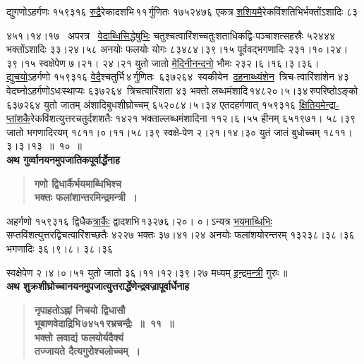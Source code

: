 \documentclass[11pt, openany]{book}
\begin{document}
द्युगणोऽहर्गणः १५९३१६ \hyperref[1.10]{रुद्रै}रेकादशभि\textendash \,११\textendash \,र्गुणितः १७५२४७६ एकत्र \hyperref[1.10]{शशियमै}रेकविंशतिभिर्भक्तोंऽशादिः ८३

\newpage

\noindent ४५१।१४।१७ ~अपरत्र ~\hyperref[1.10]{वेदाब्धिसिद्धेषुभिः} चतुश्चत्वारिंशच्चतुःशताधिकद्वि-पञ्चाशत्सहस्रैः \;५२४४४ \;भक्तोंऽशादिः \;३३।२४।५८ \;अनयोः \;फलयोः \;योगः ८३४८४।३९।१५ \;पूर्ववद्भगणादिः \;२३१।१०।२४।३९।१५ \;स्वक्षेपेण \;७।२१। २४।२१ युतो जातो \hyperref[1.10]{मेदिनीनन्दनो} भौमः २३२।६।१६।३।३६। \hyperref[1.10]{द्युचयो}ऽहर्गणो १५९३१६ \;\hyperref[1.10]{वेदै}श्चतुर्भि\textendash \,४\textendash \,र्गुणितः \,६३७२६४ \,स्वकीयेन \,\hyperref[1.10]{दहनाब्ध्यंशेन} \,त्रिच-त्वारिंशांशेन ४३ \;वेदघ्नोऽहर्गणोऽधःस्थाप्यः \;६३७२६४ \,त्रिचत्वारिंशता \;४३ \;भक्तो \;लब्धमंशादि\textendash \,१४८२०।५।३४\textendash \,रुपरिष्ठोऽङ्को \;६३७२६४ \;युतो \;जातम् अंशादिबुधशीघ्रोच्चम् ६५२०८४।५।३४ एतदहर्गणात् १५९३१६ \hyperref[1.10]{क्षितियमेन्द्रा-प्तांशकै}रेकविंशत्युत्तरचतुर्दशशतैः \;१४२१ \;भक्ताल्लब्धमंशादिना \;११२।६।५५ हीनम् ६५१९७१। ५८।३९ जातो भगणादिरयम् १८११।०।११।५८।३९ स्वक्षे-पेण २।२१।१४।३० युतं जातं बुधोच्चम् १८११।३।३।१३~॥~१०~॥\\

{\small \textbf{अथ गुर्व्वानयनमुपजातिकपूर्वार्द्धेनाह\textendash }}

 \label{1.11.1}
\begin{quote}
{\large \textbf{{\color{purple}गणो द्विधार्कैर्भयमाब्धिभिश्च \\
भक्तः फलांशान्तरमिन्द्रमन्त्री~। }}}
\end{quote}

अहर्गणो \;१५९३१६ \;द्विधैक\hyperref[1.11.1]{त्रार्कैः} \;द्वादशभि\textendash \,१३२७६।२०। ०।\textendash \,ऽन्यत्र \;\hyperref[1.11.1]{भयमाब्धिभिः} \;सप्तविंशत्युत्तरद्विचत्वारिंशच्छतैः \;४२२७ \;भक्तः \;३७।४१।२४ अनयोः फलांशयोरन्तरम् १३२३८।३८।३६ भगणादिः ३६।९।८। ३८।३६

\newpage

\noindent स्वक्षेपेण २।४।०।५१ युतो जातो ३६।११।१२।३९।२७ मध्यम् \hyperref[1.11.1]{इन्द्रमन्त्री} गुरुः\,॥\\

{\small \textbf{अथ शुक्रशीघ्रोच्चानयनमुपजात्युत्तरार्द्धेणेन्द्रवज्रापूर्वार्धेनाह\textendash }}

 \label{1.11}
\begin{quote}
{\large \textbf{{\color{purple}नृपाहतोऽह्नां निचयो द्विधासौ \\
भूबाणवेदाद्रिभि\textendash \,७४५१\textendash \,रभ्रचन्द्रैः~॥~११~॥\\
भक्तो लवाद्यं फलयोर्यदैक्यं \\
तज्जायते दैत्यगुरोश्चलोच्चम्~।}}}
\end{quote}
\end{document}
